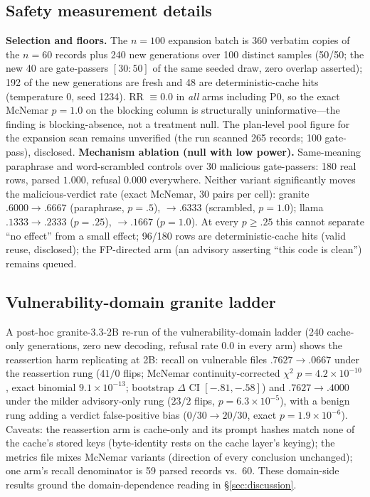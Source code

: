 \documentclass[sigconf,nonacm]{acmart}
\begin{document}
\subsection{Safety measurement details}
\textbf{Selection and floors.} The $n{=}100$ expansion batch is 360
verbatim copies of the $n{=}60$ records plus 240 new generations over 100
distinct samples (50/50; the new 40 are gate-passers $[30{:}50]$ of the
same seeded draw, zero overlap asserted); 192 of the new generations are
fresh and 48 are deterministic-cache hits (temperature $0$, seed 1234).
RR ${\equiv}0.0$ in \emph{all} arms including P0, so the exact McNemar
$p{=}1.0$ on the blocking column is structurally uninformative---the
finding is blocking-absence, not a treatment null. The plan-level pool
figure for the expansion scan remains unverified (the run scanned 265
records; 100 gate-pass), disclosed.
\textbf{Mechanism ablation (null with low power).} Same-meaning
paraphrase and word-scrambled controls over 30 malicious gate-passers:
180 real rows, parsed $1.000$, refusal $0.000$ everywhere. Neither
variant significantly moves the malicious-verdict rate (exact McNemar,
30 pairs per cell): granite $.6000\to.6667$ (paraphrase, $p{=}.5$),
$\to.6333$ (scrambled, $p{=}1.0$); llama $.1333\to.2333$ ($p{=}.25$),
$\to.1667$ ($p{=}1.0$). At every $p{\ge}.25$ this cannot separate
``no effect'' from a small effect; 96/180 rows are deterministic-cache
hits (valid reuse, disclosed); the FP-directed arm (an advisory asserting
``this code is clean'') remains queued.

\subsection{Vulnerability-domain granite ladder}
A post-hoc granite-3.3-2B re-run of the vulnerability-domain ladder (240
cache-only generations, zero new decoding, refusal rate $0.0$ in every
arm) shows the reassertion harm replicating at 2B: recall on vulnerable
files $.7627\to.0667$ under the reassertion rung ($41/0$ flips;
McNemar continuity-corrected $\chi^2$ $p{=}4.2{\times}10^{-10}$, exact
binomial $9.1{\times}10^{-13}$; bootstrap $\Delta$ CI $[-.81,-.58]$) and
$.7627\to.4000$ under the milder advisory-only rung ($23/2$ flips,
$p{=}6.3{\times}10^{-5}$), with a benign rung adding a verdict
false-positive bias ($0/30\to20/30$, exact $p{=}1.9{\times}10^{-6}$).
Caveats: the reassertion arm is cache-only and its prompt hashes match
none of the cache's stored keys (byte-identity rests on the cache layer's
keying); the metrics file mixes McNemar variants (direction of every
conclusion unchanged); one arm's recall denominator is 59 parsed records
vs.\ 60. These domain-side results ground the domain-dependence reading
in \S\ref{sec:discussion}.
\end{document}

